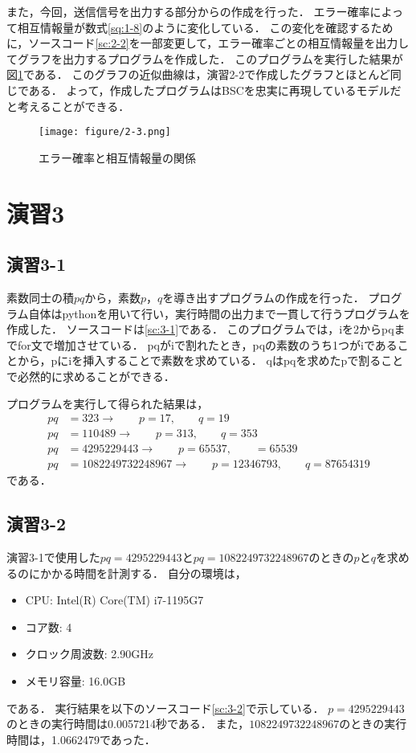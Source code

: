\documentclass[documentclass]{jsarticle}
\begin{document}
また，今回，送信信号を出力する部分からの作成を行った．
エラー確率によって相互情報量が数式\ref*{sq:1-8}のように変化している．
この変化を確認するために，ソースコード\ref*{sc:2-2}を一部変更して，エラー確率ごとの相互情報量を出力してグラフを出力するプログラムを作成した．
このプログラムを実行した結果が図\ref*{fig:2-3}である．
このグラフの近似曲線は，演習2-2で作成したグラフとほとんど同じである．
よって，作成したプログラムはBSCを忠実に再現しているモデルだと考えることができる．

\begin{figure}[H]
  \begin{center}
    \texttt{[image: figure/2-3.png]}
  \end{center}
  \caption{エラー確率と相互情報量の関係}
  \label{fig:2-3}
\end{figure}
\newpage

\section*{演習3}
\subsection*{演習3-1}
素数同士の積$pq$から，素数$p$，$q$を導き出すプログラムの作成を行った．
プログラム自体はpythonを用いて行い，実行時間の出力まで一貫して行うプログラムを作成した．
ソースコードは\ref*{sc:3-1}である．
このプログラムでは，iを2からpqまでfor文で増加させている．
pqがiで割れたとき，pqの素数のうち1つがiであることから，pにiを挿入することで素数を求めている．
qはpqを求めたpで割ることで必然的に求めることができる．

プログラムを実行して得られた結果は，
\begin{align*}
  pq &= 323  → \qquad p = 17, \qquad q = 19\\
  pq &= 110489 → \qquad p = 313, \qquad q = 353\\
  pq &= 4295229443 → \qquad p = 65537, \qquad = 65539\\
  pq &= 1082249732248967 → \qquad p =  12346793, \qquad q = 87654319
\end{align*}
である．





\subsection*{演習3-2}
演習3-1で使用した$pq = 4295229443$と$pq = 1082249732248967$のときの$p$と$q$を求めるのにかかる時間を計測する．
自分の環境は，
\begin{itemize}
  \item CPU: Intel(R) Core(TM) i7-1195G7
  \item コア数: 4
  \item クロック周波数: 2.90GHz
  \item メモリ容量: 16.0GB
\end{itemize}
である．
実行結果を以下のソースコード\ref*{sc:3-2}で示している．
$p=4295229443$のときの実行時間は0.0057214秒である．
また，$1082249732248967$のときの実行時間は，1.0662479であった．
\end{document}
